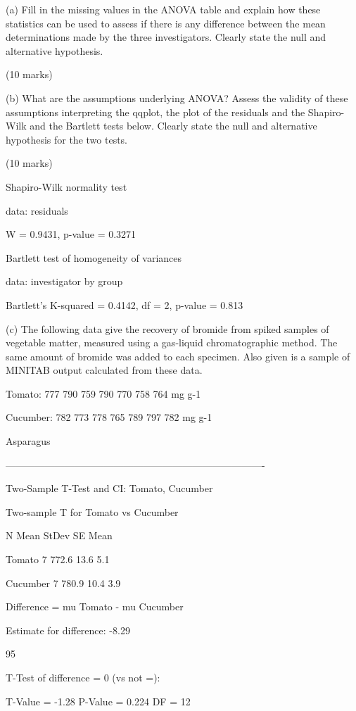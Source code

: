 (a) Fill in the missing values in the ANOVA table and explain how these statistics can be used to assess if there is any difference between the mean determinations made by the three investigators. Clearly state the null and alternative hypothesis.

(10 marks)

(b) What are the assumptions underlying ANOVA? Assess the validity of these assumptions interpreting the qqplot, the plot of the residuals and the Shapiro-Wilk and the Bartlett tests below. Clearly state the null and alternative hypothesis for the two tests.

(10 marks)

Shapiro-Wilk normality test

data: residuals

W = 0.9431, p-value = 0.3271

Bartlett test of homogeneity of variances

data: investigator by group

Bartlett's K-squared = 0.4142, df = 2, p-value = 0.813


(c) The following data give the recovery of bromide from spiked samples of vegetable matter, measured using a gas-liquid chromatographic method. The same amount of bromide was added to each specimen. Also given is a sample of MINITAB output calculated from these data.


Tomato: 777 790 759 790 770 758 764 mg g-1

Cucumber: 782 773 778 765 789 797 782 mg g-1

Asparagus

-------------------------------------------------------------------------------


Two-Sample T-Test and CI: Tomato, Cucumber

Two-sample T for Tomato vs Cucumber

N Mean StDev SE Mean

Tomato 7 772.6 13.6 5.1

Cucumber 7 780.9 10.4 3.9

Difference = mu Tomato - mu Cucumber

Estimate for difference: -8.29

95%

T-Test of difference = 0 (vs not =):

T-Value = -1.28 P-Value = 0.224 DF = 12


